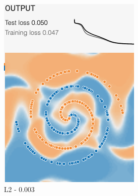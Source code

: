 \documentclass[12pt,a4paper]{article}
\begin{document}
\begin{enumerate}
\begin{figure}[H]
\begin{subfigure}[H]{0.2\textwidth}
				\includegraphics[width=\textwidth]{Figures/reg/L20003}
				\caption{L2 - 0.003}
			\end{subfigure}
			\begin{subfigure}[H]{0.2\textwidth}
				\centering

\end{subfigure}
\end{figure}
\end{enumerate}
\end{document}
